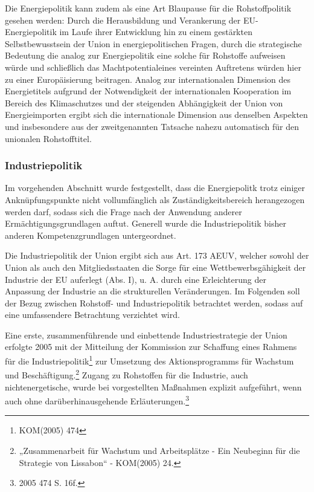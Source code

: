 \documentclass[12pt,a4paper,oneside]{book} %
\begin{document}
Die Energiepolitik kann zudem als eine Art Blaupause für die Rohstoffpolitik gesehen werden: Durch die Herausbildung und Verankerung der EU-Energiepolitik im Laufe ihrer Entwicklung hin zu einem gestärkten Selbstbewusstsein der Union in energiepolitischen Fragen, durch die strategische Bedeutung die analog zur Energiepolitik eine solche für Rohstoffe aufweisen würde und schließlich das \glqq Machtpotential\grqq eines vereinten Auftretens würden hier zu einer Europäisierung beitragen.\autocite[Nettesheim, Art. 194 Rn 44]{grabitz_recht_2024}	Analog zur internationalen Dimension des Energietitels aufgrund der Notwendigkeit der internationalen Kooperation im Bereich des Klimaschutzes und der steigenden Abhängigkeit der Union von Energieimporten\autocite{Gundel, Theobald/Kühling, Europäisches Energierecht, V. Rn. 86} ergibt sich die internationale Dimension aus denselben Aspekten und insbesondere aus der zweitgenannten Tatsache nahezu automatisch für den unionalen Rohstofftitel.
	
\subsubsection{Industriepolitik}
Im vorgehenden Abschnitt wurde festgestellt, dass die Energiepolitk trotz einiger Anknüpfungspunkte nicht vollumfänglich als Zuständigkeitsbereich herangezogen werden darf, sodass sich die Frage nach der Anwendung anderer Ermächtigungsgrundlagen auftut. Generell wurde die Industriepolitik bisher anderen Kompetenzgrundlagen untergeordnet.
	
Die Industriepolitik der Union ergibt sich aus Art. 173 AEUV, welcher sowohl der Union als auch den Mitgliedsstaaten die Sorge für eine Wettbewerbsgähigkeit der Industrie der EU auferlegt (Abs. I), u. A. durch eine \glqq Erleichterung der Anpassung der Industrie an die strukturellen Veränderungen\grqq. Im Folgenden soll der Bezug zwischen Rohstoff- und Industriepolitik betrachtet werden, sodass auf eine umfassendere Betrachtung verzichtet wird.

Eine erste, zusammenführende und einbettende Industriestrategie der Union  erfolgte 2005 mit der Mitteilung der Kommission zur Schaffung eines Rahmens für die Industriepolitik\footnote{KOM(2005) 474} zur Umsetzung des Aktionsprogramms für Wachstum und Beschäftigung.\footnote{„Zusammenarbeit für Wachstum und Arbeitsplätze - Ein Neubeginn für die Strategie von Lissabon“ - KOM(2005) 24.} Zugang zu Rohstoffen für die Industrie, auch nichtenergetische, wurde bei vorgestellten Maßnahmen explizit aufgeführt, wenn auch ohne darüberhinausgehende Erläuterungen.\footnote{2005 474 S. 16f.}
	
\end{document}
